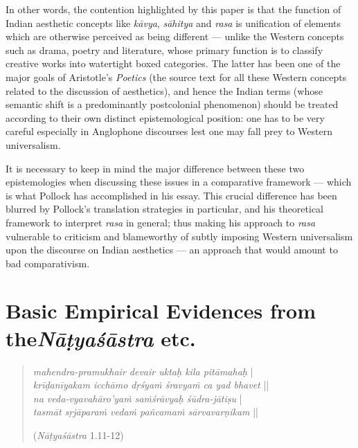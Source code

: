In other words, the contention highlighted by this paper is that the function of Indian aesthetic concepts like \textsl{kāvya}, \textsl{sāhitya} and \textsl{rasa} is unification of elements which are otherwise perceived as being different --- unlike the Western concepts such as drama, poetry and literature, whose primary function is to classify creative works into watertight boxed categories. The latter has been one of the major goals of Aristotle’s \textsl{Poetics} (the source text for all these Western concepts related to the discussion of aesthetics), and hence the Indian terms (whose semantic shift is a predominantly postcolonial phenomenon) should be treated according to their own distinct epistemological position: one has to be very careful especially in Anglophone discourses lest one may fall prey to Western universalism. 

It is necessary to keep in mind the major difference between these two epistemologies when discussing these issues in a comparative framework --- which is what Pollock has accomplished in his essay. This crucial difference has been blurred by Pollock’s translation strategies in particular, and his theoretical framework to interpret \textsl{rasa} in general; thus making his approach to \textsl{rasa} vulnerable to criticism and blameworthy of subtly imposing Western universalism upon the discourse on Indian aesthetics --- an approach that would amount to bad comparativism.\\[-21pt]

\section*{Basic Empirical Evidences from the\hfill\break \textsl{Nāṭyaśāstra} etc.}

\begin{quote}
\textsl{mahendra-pramukhair devair uktaḥ kila pitāmahaḥ} |\\[1pt]
\textsl{krīḍanīyakam icchāmo dṛśyaṁ śravyaṁ ca yad bhavet} ||\\[1pt]
\textsl{na veda-vyavahāro’yaṁ saṁśrāvyaḥ śūdra-jātiṣu} |\\[1pt]
\textsl{tasmāt sṛjāparaṁ vedaṁ pañcamaṁ sārvavarṇikam} ||   

\hfill(\textsl{Nāṭyaśāstra} 1.11-12)  
\end{quote}


